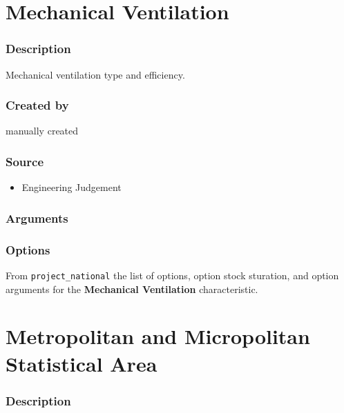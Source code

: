 \section{Mechanical Ventilation}\label{mechanical_ventilation}

\subsubsection{Description}\label{description-108}

Mechanical ventilation type and efficiency.

\subsubsection{Created by}\label{created-by-109}

manually created

\subsubsection{Source}\label{source-111}

\begin{itemize}
 
\item
  Engineering Judgement
\end{itemize}

\subsubsection{Arguments}\label{arguments-73}



\subsubsection{Options}\label{options-112}

From \texttt{project\_national} the list of options, option stock
sturation, and option arguments for the \textbf{Mechanical Ventilation}
characteristic.



\section{Metropolitan and Micropolitan Statistical
Area}\label{metropolitan_and_micropolitan_statistical_area}

\subsubsection{Description}\label{description-109}

